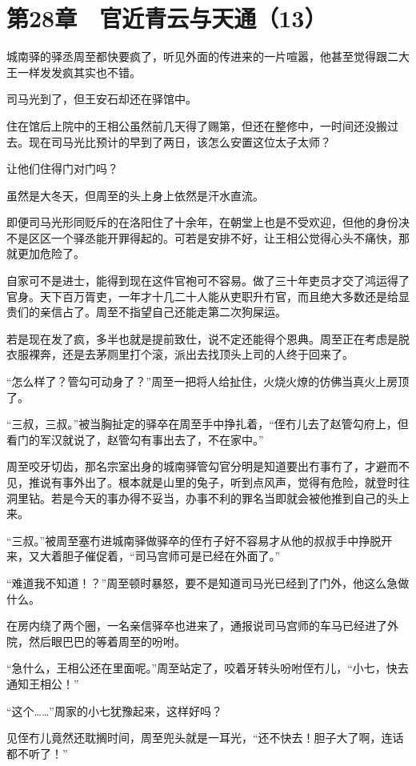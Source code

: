 \section{第28章　官近青云与天通（13）}

城南驿的驿丞周至都快要疯了，听见外面的传进来的一片喧嚣，他甚至觉得跟二大王一样发发疯其实也不错。

司马光到了，但王安石却还在驿馆中。

住在馆后上院中的王相公虽然前几天得了赐第，但还在整修中，一时间还没搬过去。现在司马光比预计的早到了两日，该怎么安置这位太子太师？

让他们住得门对门吗？

虽然是大冬天，但周至的头上身上依然是汗水直流。

即便司马光形同贬斥的在洛阳住了十余年，在朝堂上也是不受欢迎，但他的身份决不是区区一个驿丞能开罪得起的。可若是安排不好，让王相公觉得心头不痛快，那就更加危险了。

自家可不是进士，能得到现在这件官袍可不容易。做了三十年吏员才交了鸿运得了官身。天下百万胥吏，一年才十几二十人能从吏职升冇官，而且绝大多数还是给显贵们的亲信占了。周至不指望自己还能走第二次狗屎运。

若是现在发了疯，多半也就是提前致仕，说不定还能得个恩典。周至正在考虑是脱衣服裸奔，还是去茅厕里打个滚，派出去找顶头上司的人终于回来了。

“怎么样了？管勾可动身了？”周至一把将人给扯住，火烧火燎的仿佛当真火上房顶了。

“三叔，三叔。”被当胸扯定的驿卒在周至手中挣扎着，“侄冇儿去了赵管勾府上，但看门的军汉就说了，赵管勾有事出去了，不在家中。”

周至咬牙切齿，那名宗室出身的城南驿管勾官分明是知道要出冇事冇了，才避而不见，推说有事外出了。根本就是山里的兔子，听到点风声，觉得有危险，就登时往洞里钻。若是今天的事办得不妥当，办事不利的罪名当即就会被他推到自己的头上来。

“三叔。”被周至塞冇进城南驿做驿卒的侄冇子好不容易才从他的叔叔手中挣脱开来，又大着胆子催促着，“司马宫师可是已经在外面了。”

“难道我不知道！？”周至顿时暴怒，要不是知道司马光已经到了门外，他这么急做什么。

在房内绕了两个圈，一名亲信驿卒也进来了，通报说司马宫师的车马已经进了外院，然后眼巴巴的等着周至的吩咐。

“急什么，王相公还在里面呢。”周至站定了，咬着牙转头吩咐侄冇儿，“小七，快去通知王相公！”

“这个……”周家的小七犹豫起来，这样好吗？

见侄冇儿竟然还耽搁时间，周至兜头就是一耳光，“还不快去！胆子大了啊，连话都不听了！”

